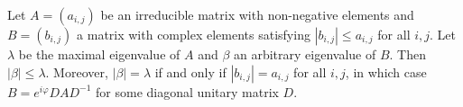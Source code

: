 Let $A = (a_{i,j})$ be an irreducible matrix with non-negative elements and $B = (b_{i,j})$ a matrix with complex elements satisfying $|b_{i,j}| \leq a_{i,j}$ for all $i, j$. Let $\lambda$ be the maximal eigenvalue of $A$ and $\beta$ an arbitrary eigenvalue of $B$. Then $|\beta| \leq \lambda$. Moreover, $|\beta| = \lambda$ if and only if $|b_{i,j}| = a_{i,j}$ for all $i, j$, in which case $B = e^{i\varphi} D A D^{-1}$ for some diagonal unitary matrix $D$.
